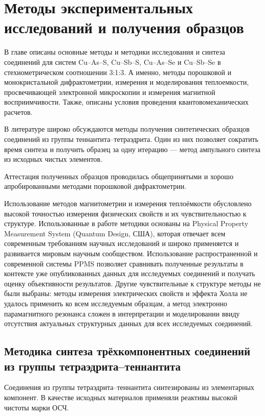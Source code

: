 \chapter{Методы экспериментальных исследований и получения образцов} \label{chapt2}

В главе описаны основные методы и методики исследования и синтеза соединений для систем Cu--As--S, Cu--Sb--S, Cu--As--Se и Cu--Sb--Se в стехиометрическом соотношении 3:1:3.
А именно, методы порошковой и монокристальной дифрактометрии, измерения и моделирования теплоемкости, просвечивающей электронной микроскопии и измерения магнитной восприимчивости.
Также, описаны условия проведения квантовомеханических расчетов.

В литературе широко обсуждаются методы получения синтетических образцов соединений из группы теннантита--тетраэдрита. Один из них позволяет сократить время синтеза и получить образец за одну итерацию --- метод ампульного синтеза из исходных чистых элементов.

Аттестация полученных образцов проводилась общепринятыми и хорошо апробированными методами порошковой дифрактометрии.

Использование методов магнитометрии и измерения теплоёмкости обусловлено высокой точностью измерения физических свойств и их чувствительностью к структуре.
Использованные в работе методики основаны на  Physical Property Measurement System (Quantum Design, США), которая отвечает всем современным требованиям научных исследований и широко применяется и развивается мировым научным сообществом.
Использование распространенной и современной системы PPMS позволяет сравнивать полученные результаты в контексте уже опубликованных данных для исследуемых соединений и получать оценку объективности результатов.
Другие чувствительные к структуре методы не были выбраны:
методы измерения электрических свойств и эффекта Холла не удалось применить ко всем исследуемым образцам, а  метод электронно парамагнитного резонанса сложен в интерпретации и моделировании ввиду отсутствия актуальных структурных данных для всех исследуемых соединений.

\section{Методика синтеза трёхкомпонентных соединений из группы тетраэдрита--теннантита} \label{sect2_1}

Соединения из группы тетраэдрита--теннантита синтезированы из элементарных компонент.
В качестве исходных материалов применяли реактивы высокой чистоты марки ОСЧ.

